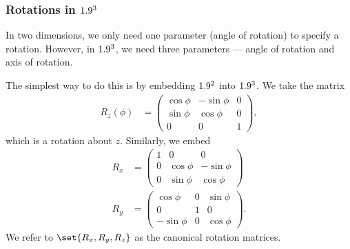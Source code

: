 \documentclass[10pt]{mypackage}
\begin{document}
\subsubsection{Rotations in $1.9^3$}%
In two dimensions, we only need one parameter (angle of rotation) to specify a rotation. However, in $1.9^3$, we need three parameters --- angle of rotation and axis of rotation.\newline

The simplest way to do this is by embedding $1.9^2$ into $1.9^3$. We take the matrix
\begin{align*}
  R_z\left(\phi\right) &= \begin{pmatrix}\cos\phi & -\sin\phi & 0 \\ \sin\phi & \cos\phi & 0 \\ 0 & 0 & 1\end{pmatrix},
\end{align*}
which is a rotation about $z$. Similarly, we embed
\begin{align*}
  R_x &= \begin{pmatrix}1 & 0 & 0 \\ 0 & \cos\phi & -\sin\phi \\ 0 & \sin\phi & \cos\phi\end{pmatrix}\\
  R_y &= \begin{pmatrix}\cos\phi & 0 & \sin\phi \\ 0 & 1 & 0 \\ -\sin\phi & 0 & \cos\phi\end{pmatrix}.
\end{align*}
We refer to $\set{R_x,R_y,R_z}$ as the canonical rotation matrices.\newline
\end{document}
